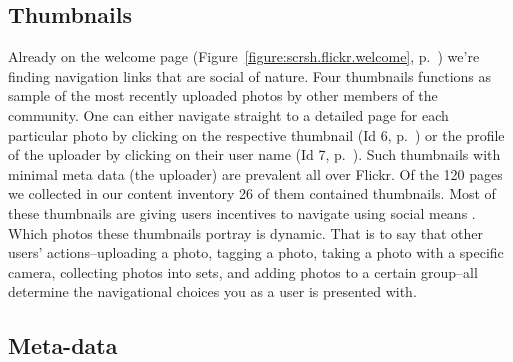 \subsection{Thumbnails}

Already on the welcome page (Figure~\ref{figure:scrsh.flickr.welcome},
p.~\pageref{figure:scrsh.flickr.welcome})
we're finding navigation links that are social of
nature. Four thumbnails functions as sample of the most recently uploaded
photos by other members of the community. One can either navigate straight to
a detailed page for each particular photo by clicking on the respective
thumbnail (Id 6, p.~\pageref{table:flickr.content.inventory.6})
or the profile of the uploader by clicking on their user
name (Id 7, p.~\pageref{table:flickr.content.inventory.7}). Such thumbnails
with minimal meta data (the uploader) are prevalent all over Flickr. Of the
120 pages we collected in our content inventory 26 of them contained
thumbnails. Most of these thumbnails
are giving users incentives to navigate using social means%
.
Which photos these thumbnails portray is dynamic. That is to say that other
users' actions--uploading a photo, tagging a photo, taking a photo with a
specific camera, collecting photos into sets, and adding photos to a certain
group--all determine the navigational choices you as a user is
presented with.

\subsection{Meta-data}

\sidefill
{}

